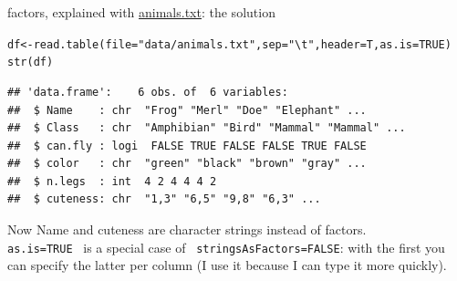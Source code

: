 \documentclass[xcolor=table,       handout,    xcolor=dvipsnames]{beamer}\usepackage[]{graphicx}\usepackage[]{color}
\makeatletter
\newcommand{\hlnum}[1]{\textcolor[rgb]{0,0,0}{#1}}
\newcommand{\hlstr}[1]{\textcolor[rgb]{0.545,0.137,0.137}{#1}}
\newcommand{\hlstd}[1]{\textcolor[rgb]{0,0,0}{#1}}
\newcommand{\hlkwb}[1]{\textcolor[rgb]{0,0,0}{#1}}
\newcommand{\hlkwc}[1]{\textcolor[rgb]{1,0,1}{#1}}
\newcommand{\hlkwd}[1]{\textcolor[rgb]{0,0,1}{#1}}
\newenvironment{kframe}{%
 \def\at@end@of@kframe{}%
 \ifinner\ifhmode%
  \def\at@end@of@kframe{\end{minipage}}%
  \begin{minipage}{\columnwidth}%
 \fi\fi%
 \def\FrameCommand##1{\hskip\@totalleftmargin \hskip-\fboxsep
 \colorbox{shadecolor}{##1}\hskip-\fboxsep
     \hskip-\linewidth \hskip-\@totalleftmargin \hskip\columnwidth}%
 \MakeFramed {\advance\hsize-\width
   \@totalleftmargin\z@ \linewidth\hsize
   \@setminipage}}%
 {\par\unskip\endMakeFramed%
 \at@end@of@kframe}
\newenvironment{knitrout}{}{} %
\newcommand{\datalink}[1]{\href{https://raw.githubusercontent.com/brry/course/master/data/#1}{#1}}
\makeatother
\begin{document}

\begin{frame}[fragile]{factors, explained with \datalink{animals.txt}: the solution}
\vspace{-0.9em} \pause
\begin{knitrout}\footnotesize
{}\color{fgcolor}\begin{kframe}
\begin{alltt}
\hlstd{df} \hlkwb{<-} \hlkwd{read.table}\hlstd{(}\hlkwc{file}\hlstd{=}\hlstr{"data/animals.txt"}\hlstd{,} \hlkwc{sep}\hlstd{=}\hlstr{"\textbackslash{}t"}\hlstd{,} \hlkwc{header}\hlstd{=T,} \hlkwc{as.is}\hlstd{=}\hlnum{TRUE}\hlstd{)}
\hlkwd{str}\hlstd{(df)}
\end{alltt}
\begin{verbatim}
## 'data.frame':	6 obs. of  6 variables:
##  $ Name    : chr  "Frog" "Merl" "Doe" "Elephant" ...
##  $ Class   : chr  "Amphibian" "Bird" "Mammal" "Mammal" ...
##  $ can.fly : logi  FALSE TRUE FALSE FALSE TRUE FALSE
##  $ color   : chr  "green" "black" "brown" "gray" ...
##  $ n.legs  : int  4 2 4 4 4 2
##  $ cuteness: chr  "1,3" "6,5" "9,8" "6,3" ...
\end{verbatim}
\end{kframe}
\end{knitrout}
Now Name and cuteness are character strings instead of factors.\\
\texttt{as.is=TRUE}~ is a special case of ~\texttt{stringsAsFactors=FALSE}: with the first you can specify the latter per column (I use it because I can type it more quickly).
\end{frame}

\end{document}
